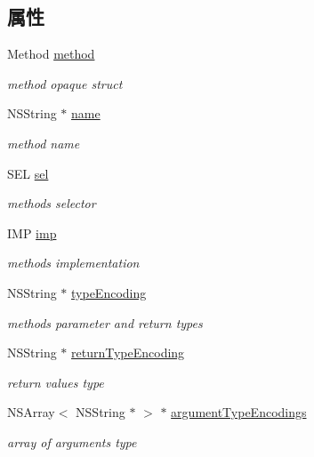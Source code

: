 \subsection*{属性}
\begin{DoxyCompactItemize}
\item 
Method \hyperlink{interface_m_a_r_class_method_info_a73571717f396749fe5a27612ac5ace61}{method}
\begin{DoxyCompactList}\small\item\em method opaque struct \end{DoxyCompactList}\item 
N\+S\+String $\ast$ \hyperlink{interface_m_a_r_class_method_info_ae95eef45e1591a134ed4f6ec9bd99d99}{name}
\begin{DoxyCompactList}\small\item\em method name \end{DoxyCompactList}\item 
S\+EL \hyperlink{interface_m_a_r_class_method_info_ad4a522cee462d193f9b271a66a9b38cc}{sel}
\begin{DoxyCompactList}\small\item\em method\textquotesingle{}s selector \end{DoxyCompactList}\item 
I\+MP \hyperlink{interface_m_a_r_class_method_info_a82d300a8986da0787a191dff1ae9fc27}{imp}
\begin{DoxyCompactList}\small\item\em method\textquotesingle{}s implementation \end{DoxyCompactList}\item 
N\+S\+String $\ast$ \hyperlink{interface_m_a_r_class_method_info_a510010b5f433289a788d631cec1c3415}{type\+Encoding}
\begin{DoxyCompactList}\small\item\em method\textquotesingle{}s parameter and return types \end{DoxyCompactList}\item 
N\+S\+String $\ast$ \hyperlink{interface_m_a_r_class_method_info_a49db3b97339dafae50c71f83b8ec173b}{return\+Type\+Encoding}
\begin{DoxyCompactList}\small\item\em return value\textquotesingle{}s type \end{DoxyCompactList}\item 
N\+S\+Array$<$ N\+S\+String $\ast$ $>$ $\ast$ \hyperlink{interface_m_a_r_class_method_info_a46229f193204a3be4f2b0c3d12a1e030}{argument\+Type\+Encodings}
\begin{DoxyCompactList}\small\item\em array of arguments\textquotesingle{} type \end{DoxyCompactList}\end{DoxyCompactItemize}


